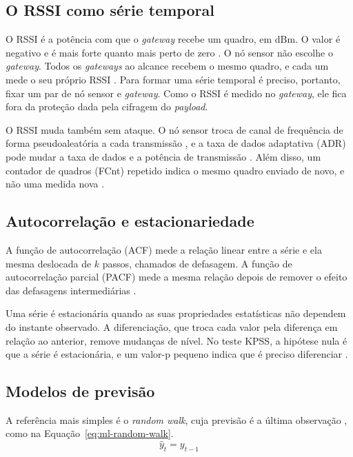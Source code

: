 \subsection{O RSSI como série temporal}
\label{subsec:ml-rssi}

O RSSI é a potência com que o \textit{gateway} recebe um quadro, em dBm. O
valor é negativo e é mais forte quanto mais perto de zero \cite{ttnrssi}. O nó
sensor não escolhe o \textit{gateway}. Todos os \textit{gateways} ao alcance
recebem o mesmo quadro, e cada um mede o seu próprio RSSI
\cite{brocaarintegration}. Para formar uma série temporal é preciso, portanto,
fixar um par de nó sensor e \textit{gateway}. Como o RSSI é medido no
\textit{gateway}, ele fica fora da proteção dada pela cifragem do
\textit{payload}.

O RSSI muda também sem ataque. O nó sensor troca de canal de frequência de
forma pseudoaleatória a cada transmissão \cite{lorawan103}, e a taxa de dados
adaptativa (ADR) pode mudar a taxa de dados e a potência de transmissão
\cite{ttnadr}. Além disso, um contador de quadros (FCnt) repetido indica o
mesmo quadro enviado de novo, e não uma medida nova \cite{lorawan103}.

\subsection{Autocorrelação e estacionariedade}
\label{subsec:ml-autocorrelacao}

A função de autocorrelação (ACF) mede a relação linear entre a série e ela
mesma deslocada de $k$ passos, chamados de defasagem. A função de
autocorrelação parcial (PACF) mede a mesma relação depois de remover o efeito
das defasagens intermediárias \cite{hyndman2021}.

Uma série é estacionária quando as suas propriedades estatísticas não dependem
do instante observado. A diferenciação, que troca cada valor pela diferença em
relação ao anterior, remove mudanças de nível. No teste KPSS, a hipótese nula é
que a série é estacionária, e um valor-p pequeno indica que é preciso
diferenciar \cite{hyndman2021}.

\subsection{Modelos de previsão}
\label{subsec:ml-modelos}

A referência mais simples é o \textit{random walk}, cuja previsão é a última
observação \cite{hyndman2021}, como na Equação~\ref{eq:ml-random-walk}.
\begin{equation}
	\hat{y}_t = y_{t-1}
	\label{eq:ml-random-walk}
\end{equation}

